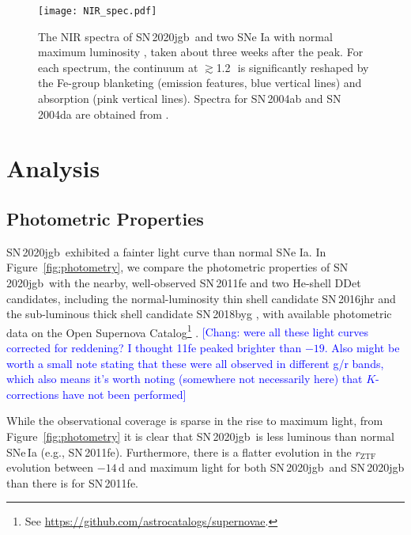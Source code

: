 \documentclass[twocolumn]{aastex631}
\newcommand{\sn}{SN\,2020jgb}
\newcommand{\chang}[1]{\textcolor{blue}{[Chang: #1]}}
\begin{document}
\begin{figure}
    \centering
    \texttt{[image: NIR\_spec.pdf]}
    \caption{The NIR spectra of \sn\ and two SNe Ia with normal maximum luminosity \citep[SN\,2004ab and SN\,2004da,][]{Marion2009_NIR}, taken about three weeks after the peak. For each spectrum, the continuum at $\gtrsim$1.2\,\micron\ is significantly reshaped by the Fe-group blanketing (emission features, blue vertical lines) and  absorption (pink vertical lines). Spectra for SN\,2004ab and SN\,2004da are obtained from \citet{Marion2009_NIR}.}
    \label{fig:NIR_spec}
\end{figure}

\section{Analysis} \label{sec:analysis}
\subsection{Photometric Properties}
\sn\ exhibited a fainter light curve than normal SNe Ia. In Figure~\ref{fig:photometry}, we compare the photometric properties of \sn\ with the nearby, well-observed SN\,2011fe \citep{Nugent_11fe_2011} and two He-shell DDet candidates, including the normal-luminosity thin shell candidate SN\,2016jhr \citep{jiang_16jhr_2017} and the sub-luminous thick shell candidate SN\,2018byg \citep{de_18byg_2019}, with available photometric data on the Open Supernova Catalog\footnote{See \url{https://github.com/astrocatalogs/supernovae}.} \citep{Guillochon_2017}. \chang{were all these light curves corrected for reddening? I thought 11fe peaked brighter than $-19$. Also might be worth a small note stating that these were all observed in different g/r bands, which also means it's worth noting (somewhere not necessarily here) that $K$-corrections have not been performed}

While the observational coverage is sparse in the rise to maximum light, from Figure~\ref{fig:photometry} it is clear that \sn\ is less luminous than normal SNe\,Ia (e.g., SN\,2011fe). Furthermore, there is a flatter evolution in the $r_\mathrm{ZTF}$ evolution between $-14$\,d and maximum light for both \sn\ and SN\,2020jgb than there is for SN\,2011fe.  
\end{document}
